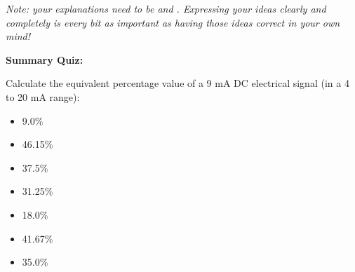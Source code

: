 \vskip 20pt

{\it Note: your explanations need to be  and .  Expressing your ideas clearly and completely is every bit as important as having those ideas correct in your own mind!}













\vfil \eject

\noindent
{\bf Summary Quiz:}

Calculate the equivalent percentage value of a 9 mA DC electrical signal (in a 4 to 20 mA range):

\begin{itemize}
\item{} 9.0\%
\vskip 5pt 
\item{} 46.15\%
\vskip 5pt 
\item{} 37.5\%
\vskip 5pt 
\item{} 31.25\%
\vskip 5pt 
\item{} 18.0\%
\vskip 5pt 
\item{} 41.67\%
\vskip 5pt 
\item{} 35.0\%
\end{itemize}




